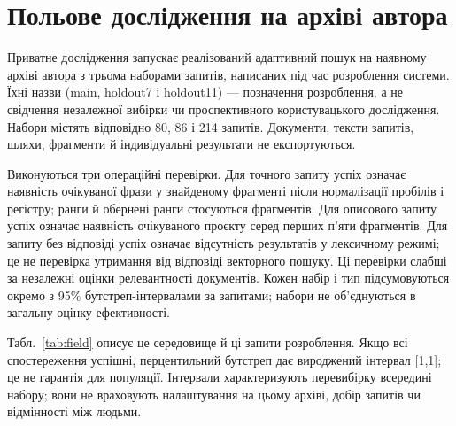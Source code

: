 \section{Польове дослідження на архіві автора}\label{sec:field}

Приватне дослідження запускає реалізований адаптивний пошук на наявному архіві автора з трьома наборами запитів, написаних під час розроблення системи. Їхні назви (main, holdout7 і holdout11) --- позначення розроблення, а не свідчення незалежної вибірки чи проспективного користувацького дослідження. Набори містять відповідно 80, 86 і 214 запитів. Документи, тексти запитів, шляхи, фрагменти й індивідуальні результати не експортуються.

Виконуються три операційні перевірки. Для точного запиту успіх означає наявність очікуваної фрази у знайденому фрагменті після нормалізації пробілів і регістру; ранги й обернені ранги стосуються фрагментів. Для описового запиту успіх означає наявність очікуваного проєкту серед перших п’яти фрагментів. Для запиту без відповіді успіх означає відсутність результатів у лексичному режимі; це не перевірка утримання від відповіді векторного пошуку. Ці перевірки слабші за незалежні оцінки релевантності документів. Кожен набір і тип підсумовуються окремо з 95\% бутстреп-інтервалами за запитами; набори не об’єднуються в загальну оцінку ефективності.

\ifpaperfield
\begin{table}[!htbp]
\centering
\caption{Операційні перевірки приватного архіву: кількості, середні та 95\% бутстреп-інтервали за запитами. Для точних запитів ранги стосуються фрагментів; описові перевіряють проєкт; безвідповідні --- лексичне утримання. Експортуються лише агрегати.}
\label{tab:field}

\end{table}
Табл.~\ref{tab:field} описує це середовище й ці запити розроблення. Якщо всі спостереження успішні, перцентильний бутстреп дає вироджений інтервал [1,1]; це не гарантія для популяції. Інтервали характеризують перевибірку всередині набору; вони не враховують налаштування на цьому архіві, добір запитів чи відмінності між людьми.
\else
{}
\fi
